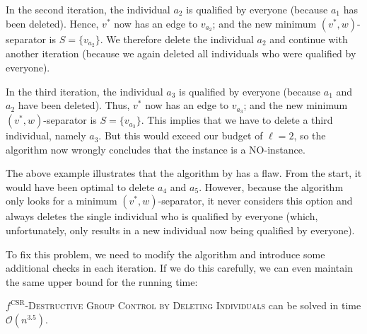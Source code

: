 \documentclass[
    12pt,               %
    a4paper,            %
    bibtotoc,           %
    pointlessnumbers,   %
    ngerman,            %
    titlepage,          %
    leqno,              %
    ]{scrarticle}       %
\begin{document}
\begin{Example}
In the second iteration, the individual $a_2$ is qualified by everyone (because $a_1$ has been deleted). Hence, $v^\ast$ now has an edge to $v_{a_2}$; and the new minimum $(v^\ast, w)$-separator is $S = \{v_{a_2}\}$. We therefore delete the individual $a_2$ and continue with another iteration (because we again deleted all individuals who were qualified by everyone).

In the third iteration, the individual $a_3$ is qualified by everyone (because $a_1$ and $a_2$ have been deleted). Thus, $v^\ast$ now has an edge to $v_{a_3}$; and the new minimum $(v^\ast, w)$-separator is $S = \{v_{a_3}\}$. This implies that we have to delete a third individual, namely $a_3$. But this would exceed our budget of $\ell = 2$, so the algorithm now wrongly concludes that the instance is a NO-instance.
\end{Example}

\vspace{1em}



The above example illustrates that the algorithm by \textcite{ERY20} has a flaw. From the start, it would have been optimal to delete $a_4$ and $a_5$. However, because the algorithm only looks for a minimum $(v^\ast, w)$-separator, it never considers this option and always deletes the single individual who is qualified by everyone (which, unfortunately, only results in a new individual now being qualified by everyone).

To fix this problem, we need to modify the algorithm and introduce some additional checks in each iteration. If we do this carefully, we can even maintain the same upper bound for the running time:



\begin{Theorem} \label{thm:csr_dgcdi_p}
$f^{\text{CSR}}$-\textsc{Destructive Group Control by Deleting Individuals} can be solved in time $\mathcal{O}(n^{3.5})$.
\end{Theorem}
\end{document}
